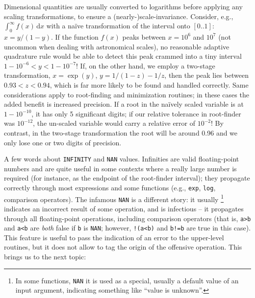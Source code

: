 \documentclass[12pt]{article}
\renewcommand{\d}{\mathrm{d}}
\begin{document}
Dimensional quantities are usually converted to logarithms before applying any scaling transformations, to ensure a (nearly-)scale-invariance. Consider, e.g., $\int_0^\infty f(x)\,\d x$ with a na\"ive transformation of the interval onto $[0..1]$: $x = y/(1-y)$. If the function $f(x)$ peaks between $x=10^6$ and $10^7$ (not uncommon when dealing with astronomical scales), no reasonable adaptive quadrature rule would be able to detect this peak crammed into a tiny interval $1-10^{-6} < y < 1-10^{-7}$! If, on the other hand, we employ a two-stage transformation, $x = \exp(y)$, $y = 1/(1-z)-1/z$, then the peak lies between $0.93<z<0.94$, which is far more likely to be found and handled correctly. Same considerations apply to root-finding and minimization routines; in these cases the added benefit is increased precision. If a root in the na\"ively scaled variable is at $1-10^{-10}$, it has only 5 significant digits; if our relative tolerance in root-finder was $10^{-12}$, the un-scaled variable would carry a relative error of $10^{-2}$! By contrast, in the two-stage transformation the root will be around 0.96 and we only lose one or two digits of precision.

A few words about \texttt{INFINITY} and \texttt{NAN} values. Infinities are valid floating-point numbers and are quite useful in some contexts where a really large number is required (for instance, as the endpoint of the root-finder interval); they propagate correctly through most expressions and some functions (e.g., \texttt{exp}, \texttt{log}, comparison operators). The infamous \texttt{NAN} is a different story: it usually%
\footnote{In some functions, \texttt{NAN} it is used as a special, usually a default value of an input argument, indicating something like ``value is unknown''.}
indicates an incorrect result of some operation, and is infectious -- it propagates through all floating-point operations, including comparison operators (that is, \texttt{a>b} and \texttt{a<b} are \textit{both} false if \texttt{b} is \texttt{NAN}; however, \texttt{!(a<b)} and \texttt{b!=b} are true in this case). This feature is useful to pass the indication of an error to the upper-level routines, but it does not allow to tag the origin of the offensive operation. This brings us to the next topic:
\end{document}
